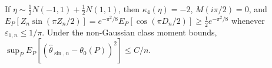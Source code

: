 If \(\eta\sim\tfrac12N(-1,1)+\tfrac12N(1,1)\), then \(\kappa_4(\eta)=-2\), \(M(i\pi/2)=0\), and \(E_P[Z_n\sin(\pi Z_n/2)]=e^{-\pi^2/8}E_P[\cos(\pi D_n/2)]\ge\tfrac12e^{-\pi^2/8}\) whenever \(\varepsilon_{1,n}\le1/\pi\). Under the non-Gaussian class moment bounds, \(\sup_P E_P[(\widehat\theta_{\sin,n}-\theta_0(P))^2]\le C/n\).
